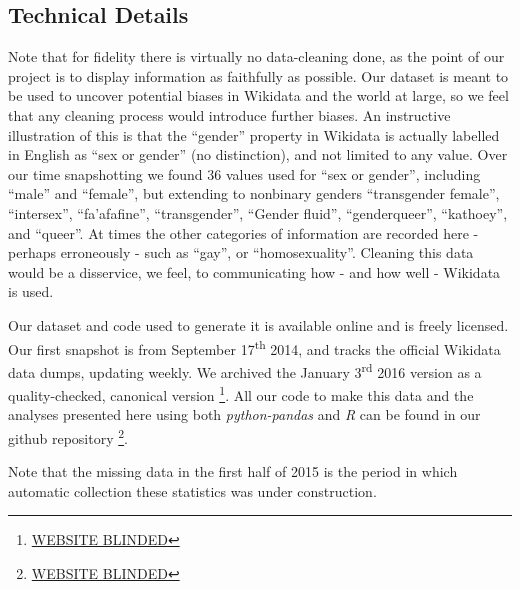 \documentclass{sig-alternate-05-2015}
\begin{document}
\subsection{Technical Details}

Note that for fidelity there is virtually no data-cleaning done, as the point of our project is to display information as faithfully as possible. Our dataset is meant to be used to uncover potential biases in Wikidata and the world at large, so we feel that any cleaning process would introduce further biases. An instructive illustration of this is that the ``gender'' property in Wikidata is actually labelled in English  as ``sex or gender'' (no distinction), and not limited to any value. Over our time snapshotting we found 36 values used for ``sex or gender'', including ``male'' and ``female'', but extending to nonbinary genders ``transgender female'', ``intersex'', ``fa'afafine'', ``transgender'', ``Gender fluid'',  ``genderqueer'', ``kathoey'', and ``queer''. At times the other categories of information are recorded here - perhaps erroneously - such as ``gay'', or ``homosexuality''. Cleaning this data would be a disservice, we feel, to communicating how - and how well - Wikidata is used.


Our dataset and code used to generate it is available online and is freely licensed. Our first snapshot is from September 17\textsuperscript{th} 2014, and tracks the official  Wikidata data dumps, updating weekly. We archived the January 3\textsuperscript{rd} 2016 version as a quality-checked, canonical version \footnote{\url{WEBSITE BLINDED}}. All our code to make this data and the analyses presented here using both \textit{python-pandas} and \textit{R} can be found in our github repository \footnote{\url{WEBSITE BLINDED}}.

Note that the missing data in the first half of 2015 is the period in which automatic collection these statistics was under construction.
\end{document}
